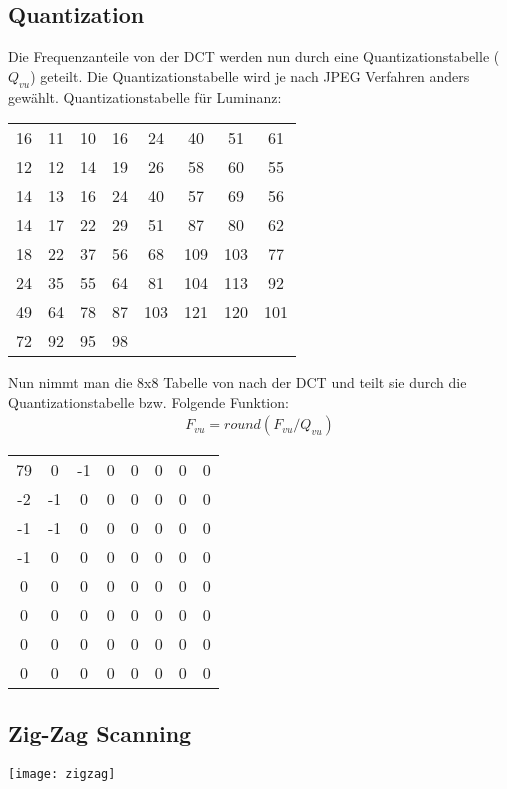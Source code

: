 \subsection{Quantization}
Die Frequenzanteile von der DCT werden nun durch eine Quantizationstabelle ($Q_{vu}$) geteilt. Die Quantizationstabelle
wird je nach JPEG Verfahren anders gewählt. Quantizationstabelle für Luminanz:
\begin{center}
    \begin{tabular}{ c c c c c c c c }
        16 & 11 & 10 & 16 & 24 & 40 & 51 & 61 \\
        12 & 12 & 14 & 19 & 26 & 58 & 60 & 55 \\
        14 & 13 & 16 & 24 & 40 & 57 & 69 & 56 \\
        14 & 17 & 22 & 29 & 51 & 87 & 80 & 62 \\
        18 & 22 & 37 & 56 & 68 & 109 & 103 & 77 \\
        24 & 35 & 55 & 64 & 81 & 104 & 113 & 92 \\
        49 & 64 & 78 & 87 & 103 & 121 & 120 & 101 \\
        72 & 92 & 95 & 98 & 
    \end{tabular}
\end{center}
Nun nimmt man die 8x8 Tabelle von nach der DCT und teilt sie durch die Quantizationstabelle bzw.
Folgende Funktion:
\begin{align*}
    F_{vu} = round(F_{vu}/Q_{vu})
\end{align*}

\begin{center}
    \begin{tabular}{ c c c c c c c c }
        79 & 0 & -1 & 0 & 0 & 0 & 0 & 0 \\
        -2 & -1 & 0 & 0 & 0 & 0 & 0 & 0 \\
        -1 & -1 & 0 & 0 & 0 & 0 & 0 & 0 \\
        -1 & 0 & 0 & 0 & 0 & 0 & 0 & 0 \\
        0 & 0 & 0 & 0 & 0 & 0 & 0 & 0 \\
        0 & 0 & 0 & 0 & 0 & 0 & 0 & 0 \\
        0 & 0 & 0 & 0 & 0 & 0 & 0 & 0 \\
        0 & 0 & 0 & 0 & 0 & 0 & 0 & 0
    \end{tabular}
\end{center}
\subsection{Zig-Zag Scanning}
\begin{center}
    \texttt{[image: zigzag]}
\end{center}


